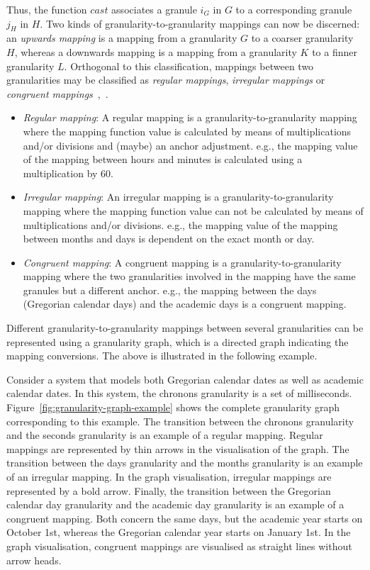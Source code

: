 Thus, the function $cast$ associates a granule $i_G$ in $G$ to a corresponding granule $j_H$ in $H$. Two kinds of granularity-to-granularity mappings can now be discerned: an \emph{upwards mapping} is a mapping from a granularity $G$ to a coarser granularity $H$, whereas a downwards mapping is a mapping from a granularity $K$ to a finner granularity $L$. Orthogonal to this classification, mappings between two granularities may be classified as \emph{regular mappings}, \emph{irregular mappings} or \emph{congruent mappings}~\cite{Lin97},~\cite{DyresonSnodgrass1994}.
\begin{itemize}
\item
\emph{Regular mapping}: A regular mapping is a granularity-to-granularity mapping where the mapping function value is calculated by means of multiplications and/or divisions and (maybe) an anchor adjustment. e.g., the mapping value of the mapping between hours and minutes is calculated using a multiplication by $60$. 
\item
\emph{Irregular mapping}: An irregular mapping is a granularity-to-granularity mapping where the mapping function value can not be calculated by means of multiplications and/or divisions. e.g., the mapping value of the mapping between months and days is dependent on the exact month or day. 
\item
\emph{Congruent mapping}: A congruent mapping is a granularity-to-granularity mapping where the two granularities involved in the mapping have the same granules but a different anchor. e.g., the mapping between the days (Gregorian calendar days) and the academic days is a congruent mapping.
\end{itemize}

Different granularity-to-granularity mappings between several granularities can be represented using a granularity graph, which is a directed graph indicating the mapping conversions. The above is illustrated in the following example.

\begin{example}
\label{examplegrangraph}
Consider a system that models both Gregorian calendar dates as well as academic calendar dates. In this system, the chronons granularity is a set of milliseconds. Figure~\ref{fig:granularity-graph-example} shows the complete granularity graph corresponding to this example. The transition between the chronons granularity and the seconds granularity is an example of a regular mapping. Regular mappings are represented by thin arrows in the visualisation of the graph. The transition between the days granularity and the months granularity is an example of an irregular mapping. In the graph visualisation, irregular mappings are represented by a bold arrow. Finally, the transition between the Gregorian calendar day granularity and the academic day granularity is an example of a congruent mapping. Both concern the same days, but the academic year starts on October 1st, whereas the Gregorian calendar year starts on January 1st. In the graph visualisation, congruent mappings are visualised as straight lines without arrow heads.

\end{example}




